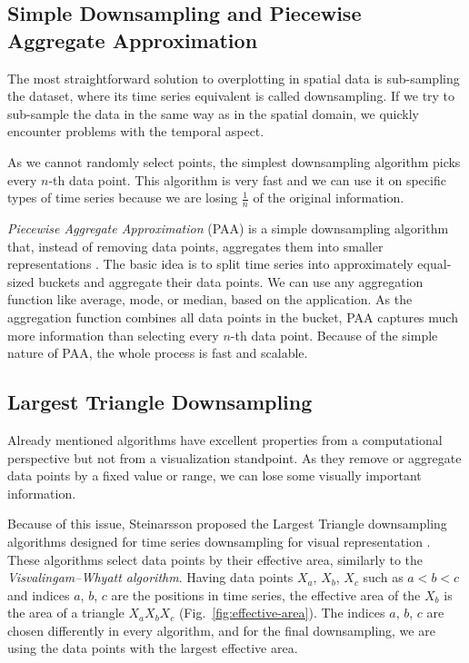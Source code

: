 \subsection{Simple Downsampling and Piecewise Aggregate Approximation}
The most straightforward solution to overplotting in spatial data is sub-sampling the dataset, where its time series equivalent is called downsampling. If we try to sub-sample the data in the same way as in the spatial domain, we quickly encounter problems with the temporal aspect.

As we cannot randomly select points, the simplest downsampling algorithm picks every $n$-th data point. This algorithm is very fast and we can use it on specific types of time series because we are losing $\frac{1}{n}$ of the original information.

\textit{Piecewise Aggregate Approximation} (PAA) is a simple downsampling algorithm that, instead of removing data points, aggregates them into smaller representations \cite{vis:paa}. The basic idea is to split time series into approximately equal-sized buckets and aggregate their data points. We can use any aggregation function like average, mode, or median, based on the application. As the aggregation function combines all data points in the bucket, PAA captures much more information than selecting every $n$-th data point. Because of the simple nature of PAA, the whole process is fast and scalable.

\subsection{Largest Triangle Downsampling}
Already mentioned algorithms have excellent properties from a computational perspective but not from a visualization standpoint. As they remove or aggregate data points by a fixed value or range, we can lose some visually important information.

Because of this issue, Steinarsson proposed the Largest Triangle downsampling algorithms designed for time series downsampling for visual representation \cite{vis:lttb}. These algorithms select data points by their effective area, similarly to the \textit{Visvalingam–Whyatt algorithm}. Having data points $X_a$, $X_b$, $X_c$ such as $a < b < c$ and indices $a$, $b$, $c$ are the positions in time series, the effective area of the $X_b$ is the area of a triangle $X_a X_b X_c$ (Fig.~\ref{fig:effective-area}). The indices $a$, $b$, $c$ are chosen differently in every algorithm, and for the final downsampling, we are using the data points with the largest effective area.

